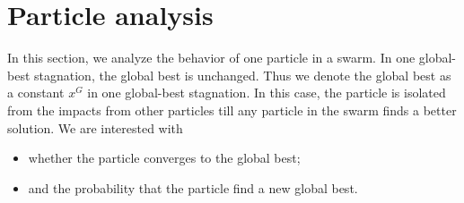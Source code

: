\section{Particle analysis}
\label{sec:particle}





In this section, we analyze the behavior of one particle in a swarm.
In one global-best stagnation, the global best is unchanged.
Thus we denote the global best as a constant $ x^{G} $ in one global-best stagnation.
In this case, the particle is isolated from the impacts from other particles till any particle in the swarm finds a better solution.
We are interested with 
\begin{itemize}
\item whether the particle converges to the global best;
\item and the probability that the particle find a new global best.
\end{itemize}

